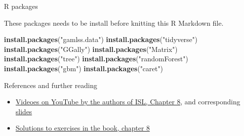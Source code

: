 \documentclass[ignorenonframetext,]{beamer}
\newenvironment{Shaded}{\begin{snugshade}}{\end{snugshade}}
\newcommand{\KeywordTok}[1]{\textcolor[rgb]{0.13,0.29,0.53}{\textbf{#1}}}
\newcommand{\StringTok}[1]{\textcolor[rgb]{0.31,0.60,0.02}{#1}}
\newcommand{\NormalTok}[1]{#1}
\providecommand{\tightlist}{%
  \setlength{\itemsep}{0pt}\setlength{\parskip}{0pt}}
\begin{document}
\begin{frame}[fragile]{R packages}

These packages needs to be install before knitting this R Markdown file.

\begin{Shaded}
\begin{Highlighting}[]
\KeywordTok{install.packages}\NormalTok{(}\StringTok{"gamlss.data"}\NormalTok{)}
\KeywordTok{install.packages}\NormalTok{(}\StringTok{"tidyverse"}\NormalTok{)}
\KeywordTok{install.packages}\NormalTok{(}\StringTok{"GGally"}\NormalTok{)}
\KeywordTok{install.packages}\NormalTok{(}\StringTok{"Matrix"}\NormalTok{)}
\KeywordTok{install.packages}\NormalTok{(}\StringTok{"tree"}\NormalTok{)}
\KeywordTok{install.packages}\NormalTok{(}\StringTok{"randomForest"}\NormalTok{)}
\KeywordTok{install.packages}\NormalTok{(}\StringTok{"gbm"}\NormalTok{)}
\KeywordTok{install.packages}\NormalTok{(}\StringTok{"caret"}\NormalTok{)}
\end{Highlighting}
\end{Shaded}

\end{frame}

\begin{frame}{References and further reading}

\begin{itemize}
\tightlist
\item
  \href{https://www.youtube.com/playlist?list=PL5-da3qGB5IB23TLuA8ZgVGC8hV8ZAdGh}{Videoes
  on YouTube by the authors of ISL, Chapter 8}, and corresponding
  \href{https://lagunita.stanford.edu/c4x/HumanitiesScience/StatLearning/asset/trees.pdf}{slides}
\item
  \href{https://rstudio-pubs-static.s3.amazonaws.com/65564_925dfde884e14ef9b5735eddd16c263e.html}{Solutions
  to exercises in the book, chapter 8}
\end{itemize}

\end{frame}
\end{document}
